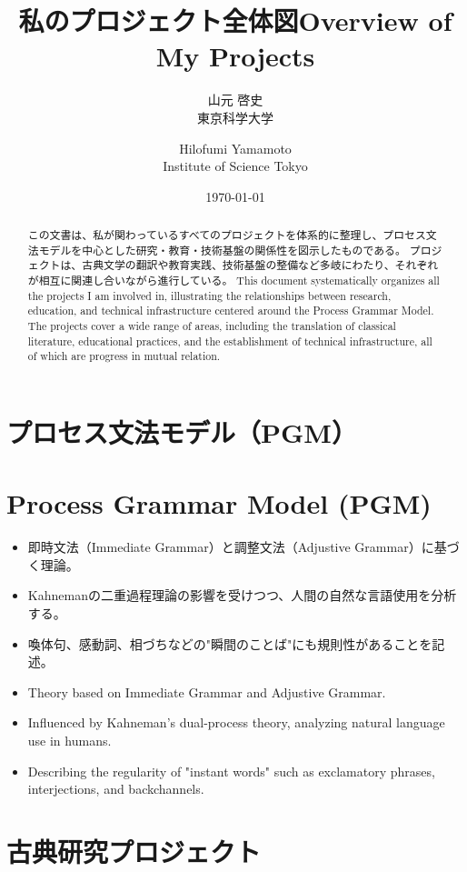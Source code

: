\documentclass{bxjsarticle}
\title{私のプロジェクト全体図}
\author{山元 啓史\\東京科学大学}
\title{Overview of My Projects}
\author{Hilofumi Yamamoto\\Institute of Science Tokyo}
\date{\today} %
\begin{document}
\maketitle

\begin{abstract}
\ifJPN
この文書は、私が関わっているすべてのプロジェクトを体系的に整理し、プロセス文法モデルを中心とした研究・教育・技術基盤の関係性を図示したものである。
プロジェクトは、古典文学の翻訳や教育実践、技術基盤の整備など多岐にわたり、それぞれが相互に関連し合いながら進行している。
\else
This document systematically organizes all the projects I am involved in, illustrating the relationships between research, education, and technical infrastructure centered around the Process Grammar Model.
The projects cover a wide range of areas, including the translation of classical literature, educational practices, and the establishment of technical infrastructure, all of which are progress in mutual relation.
\fi
\end{abstract}

\ifJPN
\section{プロセス文法モデル（PGM）}
\else
  \section{Process Grammar Model (PGM)}
\fi

\begin{itemize}
\ifJPN
  \item 即時文法（Immediate Grammar）と調整文法（Adjustive Grammar）に基づく理論。
  \item Kahnemanの二重過程理論の影響を受けつつ、人間の自然な言語使用を分析する。
  \item 喚体句、感動詞、相づちなどの"瞬間のことば"にも規則性があることを記述。
\else
  \item Theory based on Immediate Grammar and Adjustive Grammar.
  \item Influenced by Kahneman's dual-process theory, analyzing natural language use in humans.
  \item Describing the regularity of "instant words" such as exclamatory phrases, interjections, and backchannels.
\fi
\end{itemize}

\ifJPN
\section{古典研究プロジェクト}
\else
\end{document}
